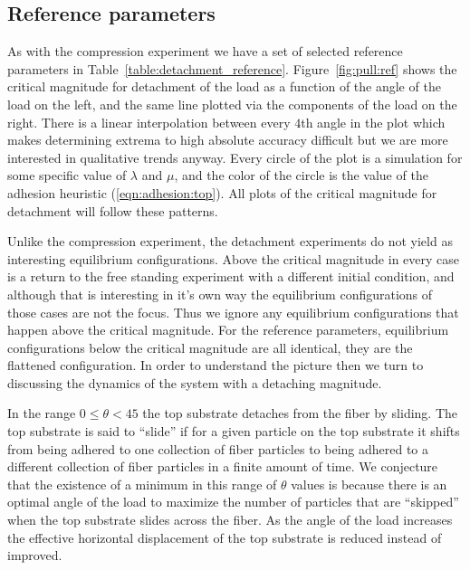 \subsection{Reference parameters}

As with the compression experiment we have a set of selected reference parameters in Table~\ref{table:detachment_reference}. Figure~\ref{fig:pull:ref} shows the critical magnitude for detachment of the load as a function of the angle of the load on the left, and the same line plotted via the components of the load on the right. There is a linear interpolation between every $4$th angle in the plot which makes determining extrema to high absolute accuracy difficult but we are more interested in qualitative trends anyway. Every circle of the plot is a simulation for some specific value of $\lambda$ and $\mu$, and the color of the circle is the value of the adhesion heuristic (\ref{eqn:adhesion:top}). All plots of the critical magnitude for detachment will follow these patterns.

Unlike the compression experiment, the detachment experiments do not yield as interesting equilibrium configurations. Above the critical magnitude in every case is a return to the free standing experiment with a different initial condition, and although that is interesting in it's own way the equilibrium configurations of those cases are not the focus. Thus we ignore any equilibrium configurations that happen above the critical magnitude. For the reference parameters, equilibrium configurations below the critical magnitude are all identical, they are the flattened configuration. In order to understand the picture then we turn to discussing the dynamics of the system with a detaching magnitude.

In the range $0 \leq \theta < 45$ the top substrate detaches from the fiber by sliding. The top substrate is said to ``slide'' if for a given particle on the top substrate it shifts from being adhered to one collection of fiber particles to being adhered to a different collection of fiber particles in a finite amount of time. We conjecture that the existence of a minimum in this range of $\theta$ values is because there is an optimal angle of the load to maximize the number of particles that are ``skipped'' when the top substrate slides across the fiber. As the angle of the load increases the effective horizontal displacement of the top substrate is reduced instead of improved.

